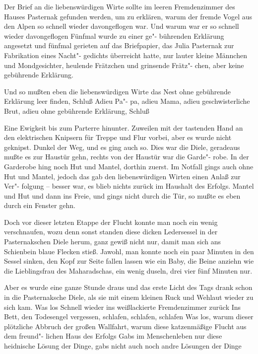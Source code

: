 Der Brief an die liebenswürdigen Wirte sollte im leeren
Fremdenzimmer des Hauses Pasternak gefunden werden,
um zu erklären, warum der fremde Vogel aus den Alpen
so schnell wieder davongeflogen war. Und warum war er so
schnell wieder davongeflogen\frag{} Fünfmal wurde zu einer ge"-%
bührenden Erklärung angesetzt und fünfmal gerieten auf das
Briefpapier, das Julia Pasternak zur Fabrikation eines Nacht"-%
gedichts überreicht hatte, nur lauter kleine Männchen und
Mondgesichter, heulende Frätzchen und grinsende Frätz"-%
chen, aber keine gebührende Erklärung.

Und so mußten eben die liebenswürdigen Wirte das Nest
ohne gebührende Erklärung leer finden, Schluß\ausr{} Adieu Pa"-%
pa, adieu Mama, adieu geschwisterliche Brut, adieu ohne
gebührende Erklärung, Schluß\ausr{}

Eine Ewigkeit bis zum Parterre hinunter. Zuweilen mit der
tastenden Hand an den elektrischen Knipsern für Treppe und
Flur vorbei, aber es wurde nicht geknipst. Dunkel der Weg,
und es ging auch so. Dies war die Diele, geradeaus mußte
es zur Haustür gehn, rechts von der Haustür war die Garde"-%
robe. In der Garderobe hing noch Hut und Mantel, dorthin
zuerst. Im Notfall gings auch ohne Hut und Mantel, jedoch
das gab den liebenswürdigen Wirten einen Anlaß zur Ver"-%
folgung -- besser war, es blieb nichts zurück im Haushalt
des Erfolgs. Mantel und Hut und dann ins Freie, und gings
nicht durch die Tür, so mußte es eben durch ein Fenster
gehn.

Doch vor dieser letzten Etappe der Flucht konnte man noch
ein wenig verschnaufen, wozu denn sonst standen diese dicken
Ledersessel in der Pasternakschen Diele herum, ganz gewiß
nicht nur, damit man sich ans Schienbein blaue Flecken stieß.
Jawohl, man konnte noch ein paar Minuten in den Sessel
sinken, den Kopf zur Seite fallen lassen wie ein Baby, die
Beine anziehn wie die Lieblingsfrau des Maharadschas, ein
wenig duseln, drei vier fünf Minuten nur.


Aber es wurde eine ganze Stunde draus und das erste Licht
des Tags drank schon in die Pasternaksche Diele, als sie mit
einem kleinen Ruck und Wehlaut wieder zu sich kam. Was los\frag{}
Schnell wieder ins weißlackierte Fremdenzimmer zurück\frag{}
Ins Bett, den Todesengel vergessen, schlafen, schlafen,
schlafen\frag{} Was los, warum dieser plötzliche Abbruch der großen
Wallfahrt, warum diese katzenmäßige Flucht aus dem freund"-%
lichen Haus des Erfolgs\frag{} Gabs im Menschenleben nur diese
heidnische Lösung der Dinge, gabs nicht auch noch andre
Lösungen der Dinge\frag{}

